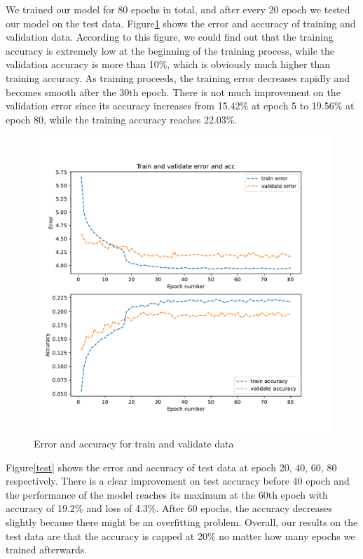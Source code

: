 \documentclass{article}
\begin{document}
We trained our model for 80 epochs in total, and after every 20 epoch we tested our model on the test data. Figure\ref{train} shows the error and accuracy of training and validation data. According to this figure, we could find out that the training accuracy is extremely low at the beginning of the training process, while the validation accuracy is more than 10\%, which is obviously much higher than training accuracy. As training proceeds, the training error decreases rapidly and becomes smooth after the 30th epoch. There is not much improvement on the validation error since its accuracy increases from 15.42\% at epoch 5 to 19.56\% at epoch 80, while the training accuracy reaches 22.03\%. 

\begin{figure}[H]
\centerline{\includegraphics[scale=0.4]{train.pdf}}
\caption{Error and accuracy for train and validate data}
\label{train}
\end{figure}

Figure\ref{test} shows the error and accuracy of test data at epoch 20, 40, 60, 80 respectively. There is a clear improvement on test accuracy before 40 epoch and the performance of the model reaches its maximum at the 60th epoch with accuracy of 19.2\% and loss of 4.3\%. After 60 epochs, the accuracy decreases slightly because there might be an overfitting problem. Overall, our results on the test data are that the accuracy is capped at 20\% no matter how many epochs we trained afterwards. 
\end{document}
